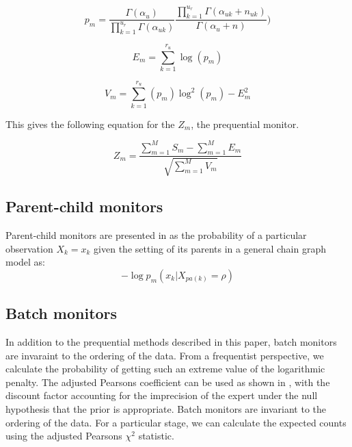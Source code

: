 \documentclass[12pt]{article}
\begin{document}
\begin{equation}
p_m= \frac{\Gamma(\alpha_u)}{\prod_{k=1}^{u_r} \Gamma(\alpha_{uk})} \frac{\prod_{k=1}^{u_r}\Gamma(\alpha_{uk} + n_{uk})}{\Gamma(\alpha_u + n)})
\end{equation}

\begin{equation}
E_m = \sum_{k=1}^{r_u}  \log (p_m)
\end{equation} 

\begin{equation}
V_m = \sum_{k=1}^{r_u} (p_m) \log^2 (p_m) - E_m^2
\end{equation}

This gives the following equation for the $Z_m$, the prequential monitor. 

\[
Z_m = \frac{\sum_{m=1}^{M} S_m - \sum_{m=1}^{M} E_m}{\sqrt{\sum_{m=1}^{M} V_m}}
\]



\subsection{Parent-child monitors}

%
Parent-child monitors are presented in \cite{diagnostics} as the probability of a particular observation $X_k = x_k$ given the setting of its parents in a general chain graph model as:
\begin{equation}
-\log p_m (x_k | X_{pa(k)}=\rho)
\end{equation}


\subsection{Batch monitors}

In addition to the prequential methods described in this paper, batch monitors are invaraint to the ordering of the data. From a frequentist perspective, we calculate the probability of getting such an extreme value of the logarithmic penalty.  The adjusted Pearsons coefficient can be used as shown in \cite{Spiegelhalter1994}, with the discount factor accounting for the imprecision of the expert under the null hypothesis that the prior is appropriate. 
Batch monitors are invariant to the ordering of the data. For a particular stage, we can calculate the expected counts using the adjusted Pearsons $\chi^2$ statistic.   
\end{document}
